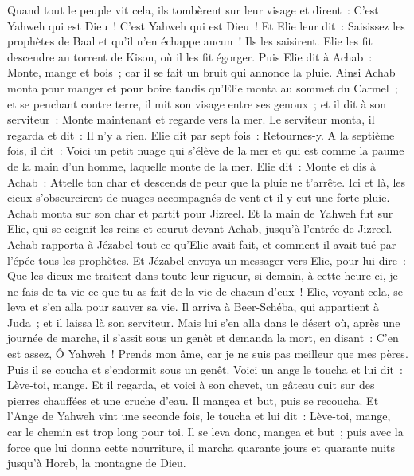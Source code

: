 \begin{multicols}{2}
Quand tout le peuple vit cela, ils tombèrent sur leur visage et dirent~: C'est Yahweh qui est Dieu~! C'est Yahweh qui est Dieu~!
Et Elie leur dit~: Saisissez les prophètes de Baal et qu'il n'en échappe aucun~! Ils les saisirent. Elie les fit descendre au torrent de Kison, où il les fit égorger.
Puis Elie dit à Achab~: Monte, mange et bois~; car il se fait un bruit qui annonce la pluie.
Ainsi Achab monta pour manger et pour boire tandis qu'Elie monta au sommet du Carmel~; et se penchant contre terre, il mit son visage entre ses genoux~;
et il dit à son serviteur~: Monte maintenant et regarde vers la mer. Le serviteur monta, il regarda et dit~: Il n'y a rien. Elie dit par sept fois~: Retournes-y.
A la septième fois, il dit~: Voici un petit nuage qui s'élève de la mer et qui est comme la paume de la main d'un homme, laquelle monte de la mer. Elie dit~: Monte et dis à Achab~: Attelle ton char et descends de peur que la pluie ne t'arrête.
Ici et là, les cieux s'obscurcirent de nuages accompagnés de vent et il y eut une forte pluie. Achab monta sur son char et partit pour Jizreel.
Et la main de Yahweh fut sur Elie, qui se ceignit les reins et courut devant Achab, jusqu'à l'entrée de Jizreel.
\VerseOne{}Achab rapporta à Jézabel tout ce qu'Elie avait fait, et comment il avait tué par l'épée tous les prophètes.
Et Jézabel envoya un messager vers Elie, pour lui dire~: Que les dieux me traitent dans toute leur rigueur, si demain, à cette heure-ci, je ne fais de ta vie ce que tu as fait de la vie de chacun d'eux~!
Elie, voyant cela, se leva et s'en alla pour sauver sa vie. Il arriva à Beer-Schéba, qui appartient à Juda~; et il laissa là son serviteur.
Mais lui s'en alla dans le désert où, après une journée de marche, il s'assit sous un genêt et demanda la mort, en disant~: C'en est assez, Ô Yahweh~! Prends mon âme, car je ne suis pas meilleur que mes pères.
Puis il se coucha et s'endormit sous un genêt. Voici un ange le toucha et lui dit~: Lève-toi, mange.
Et il regarda, et voici à son chevet, un gâteau cuit sur des pierres chauffées et une cruche d'eau. Il mangea et but, puis se recoucha.
Et l'Ange de Yahweh vint une seconde fois, le toucha et lui dit~: Lève-toi, mange, car le chemin est trop long pour toi.
Il se leva donc, mangea et but~; puis avec la force que lui donna cette nourriture, il marcha quarante jours et quarante nuits jusqu'à Horeb, la montagne de Dieu.

\end{multicols}
